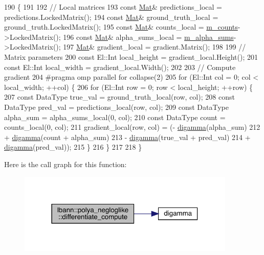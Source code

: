 \begin{DoxyCode}
190                                                                    \{
191 
192   \textcolor{comment}{// Local matrices}
193   \textcolor{keyword}{const} \hyperlink{base_8hpp_a68f11fdc31b62516cb310831bbe54d73}{Mat}& predictions\_local = predictions.LockedMatrix();
194   \textcolor{keyword}{const} \hyperlink{base_8hpp_a68f11fdc31b62516cb310831bbe54d73}{Mat}& ground\_truth\_local = ground\_truth.LockedMatrix();
195   \textcolor{keyword}{const} \hyperlink{base_8hpp_a68f11fdc31b62516cb310831bbe54d73}{Mat}& counts\_local = \hyperlink{classlbann_1_1polya__negloglike_a441387814cd7deafb1f70c91926d3004}{m\_counts}->LockedMatrix();
196   \textcolor{keyword}{const} \hyperlink{base_8hpp_a68f11fdc31b62516cb310831bbe54d73}{Mat}& alpha\_sums\_local = \hyperlink{classlbann_1_1polya__negloglike_aa77620f256de700ae8b3ca921957bcd1}{m\_alpha\_sums}->LockedMatrix();
197   \hyperlink{base_8hpp_a68f11fdc31b62516cb310831bbe54d73}{Mat}& gradient\_local = gradient.Matrix();
198 
199   \textcolor{comment}{// Matrix parameters}
200   \textcolor{keyword}{const} El::Int local\_height = gradient\_local.Height();
201   \textcolor{keyword}{const} El::Int local\_width = gradient\_local.Width();
202 
203   \textcolor{comment}{// Compute gradient}
204 \textcolor{preprocessor}{  #pragma omp parallel for collapse(2)}
205   \textcolor{keywordflow}{for} (El::Int col = 0; col < local\_width; ++col) \{
206     \textcolor{keywordflow}{for} (El::Int row = 0; row < local\_height; ++row) \{
207       \textcolor{keyword}{const} DataType true\_val = ground\_truth\_local(row, col);
208       \textcolor{keyword}{const} DataType pred\_val = predictions\_local(row, col);
209       \textcolor{keyword}{const} DataType alpha\_sum = alpha\_sums\_local(0, col);
210       \textcolor{keyword}{const} DataType count = counts\_local(0, col);
211       gradient\_local(row, col) = (- \hyperlink{polya__negloglike_8cpp_afcc4e1443ca078661f655ac37772ffc4}{digamma}(alpha\_sum)
212                                   + \hyperlink{polya__negloglike_8cpp_afcc4e1443ca078661f655ac37772ffc4}{digamma}(count + alpha\_sum)
213                                   - \hyperlink{polya__negloglike_8cpp_afcc4e1443ca078661f655ac37772ffc4}{digamma}(true\_val + pred\_val)
214                                   + \hyperlink{polya__negloglike_8cpp_afcc4e1443ca078661f655ac37772ffc4}{digamma}(pred\_val));
215     \}
216   \}
217 
218 \}
\end{DoxyCode}
Here is the call graph for this function\+:\nopagebreak
\begin{figure}[H]
\begin{center}
\leavevmode
\includegraphics[width=294pt]{classlbann_1_1polya__negloglike_a95fea60663d86cab31d89531046cc32c_cgraph}
\end{center}
\end{figure}
